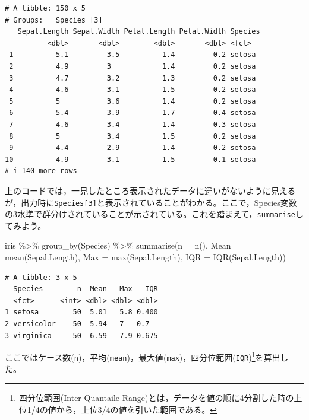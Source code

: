 \documentclass[
  a4paper,
]{ltjsbook}
\newenvironment{Shaded}{\begin{snugshade}}{\end{snugshade}}
\newcommand{\AttributeTok}[1]{\textcolor[rgb]{0.40,0.45,0.13}{#1}}
\newcommand{\FunctionTok}[1]{\textcolor[rgb]{0.28,0.35,0.67}{#1}}
\newcommand{\NormalTok}[1]{\textcolor[rgb]{0.00,0.23,0.31}{#1}}
\newcommand{\SpecialCharTok}[1]{\textcolor[rgb]{0.37,0.37,0.37}{#1}}
\begin{document}
\begin{verbatim}
# A tibble: 150 x 5
# Groups:   Species [3]
   Sepal.Length Sepal.Width Petal.Length Petal.Width Species
          <dbl>       <dbl>        <dbl>       <dbl> <fct>  
 1          5.1         3.5          1.4         0.2 setosa 
 2          4.9         3            1.4         0.2 setosa 
 3          4.7         3.2          1.3         0.2 setosa 
 4          4.6         3.1          1.5         0.2 setosa 
 5          5           3.6          1.4         0.2 setosa 
 6          5.4         3.9          1.7         0.4 setosa 
 7          4.6         3.4          1.4         0.3 setosa 
 8          5           3.4          1.5         0.2 setosa 
 9          4.4         2.9          1.4         0.2 setosa 
10          4.9         3.1          1.5         0.1 setosa 
# i 140 more rows
\end{verbatim}

上のコードでは，一見したところ表示されたデータに違いがないように見えるが，出力時に\texttt{Species{[}3{]}}と表示されていることがわかる。ここで，Species変数の3水準で群分けされていることが示されている。これを踏まえて，\texttt{summarise}してみよう。

\begin{Shaded}
\begin{Highlighting}[]
\NormalTok{iris }\SpecialCharTok{\%\textgreater{}\%} 
  \FunctionTok{group\_by}\NormalTok{(Species) }\SpecialCharTok{\%\textgreater{}\%} 
  \FunctionTok{summarise}\NormalTok{(}\AttributeTok{n =} \FunctionTok{n}\NormalTok{(),}
            \AttributeTok{Mean =} \FunctionTok{mean}\NormalTok{(Sepal.Length),}
            \AttributeTok{Max =} \FunctionTok{max}\NormalTok{(Sepal.Length),}
            \AttributeTok{IQR =} \FunctionTok{IQR}\NormalTok{(Sepal.Length))}
\end{Highlighting}
\end{Shaded}

\begin{verbatim}
# A tibble: 3 x 5
  Species        n  Mean   Max   IQR
  <fct>      <int> <dbl> <dbl> <dbl>
1 setosa        50  5.01   5.8 0.400
2 versicolor    50  5.94   7   0.7  
3 virginica     50  6.59   7.9 0.675
\end{verbatim}

ここではケース数(\texttt{n})，平均(\texttt{mean})，最大値(\texttt{max})，四分位範囲(\texttt{IQR})\footnote{四分位範囲(Inter
  Quantaile
  Range)とは，データを値の順に4分割した時の上位1/4の値から，上位3/4の値を引いた範囲である。}を算出した。
\end{document}
